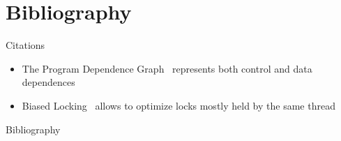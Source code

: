 

\part{Bibliography}

\begin{frame}
\partpage
\end{frame}

\begin{frame}{Citations}
\begin{itemize}
  \item The Program Dependence Graph~\cite{DBLP:journals/toplas/FerranteOW87}
        represents both control and data dependences
  \item Biased Locking~\cite{DBLP:conf/oopsla/RussellD06} allows to optimize
        locks mostly held by the same thread
\end{itemize}
\end{frame}

\begin{frame}{Bibliography}


\end{frame}
